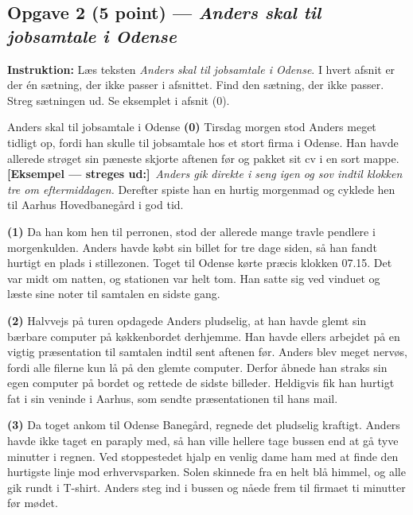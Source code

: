 \subsection*{Opgave 2 (5 point) --- \textit{Anders skal til jobsamtale i Odense}}

\textbf{Instruktion:} Læs teksten \textit{Anders skal til jobsamtale i Odense}. I hvert afsnit er der én sætning, der ikke passer i afsnittet. Find den sætning, der ikke passer. Streg sætningen ud. Se eksemplet i afsnit (0).

\begin{emailbox}{Anders skal til jobsamtale i Odense}
\textbf{(0)} Tirsdag morgen stod Anders meget tidligt op, fordi han skulle til jobsamtale hos et stort firma i Odense. Han havde allerede strøget sin pæneste skjorte aftenen før og pakket sit cv i en sort mappe. \textcolor{NCDRed}{\textbf{[Eksempel --- streges ud:]}}\ \textit{Anders gik direkte i seng igen og sov indtil klokken tre om eftermiddagen.} Derefter spiste han en hurtig morgenmad og cyklede hen til Aarhus Hovedbanegård i god tid.

\vspace{0.35em}
\textbf{(1)} Da han kom hen til perronen, stod der allerede mange travle pendlere i morgenkulden. Anders havde købt sin billet for tre dage siden, så han fandt hurtigt en plads i stillezonen. Toget til Odense kørte præcis klokken 07.15. Det var midt om natten, og stationen var helt tom. Han satte sig ved vinduet og læste sine noter til samtalen en sidste gang.

\vspace{0.35em}
\textbf{(2)} Halvvejs på turen opdagede Anders pludselig, at han havde glemt sin bærbare computer på køkkenbordet derhjemme. Han havde ellers arbejdet på en vigtig præsentation til samtalen indtil sent aftenen før. Anders blev meget nervøs, fordi alle filerne kun lå på den glemte computer. Derfor åbnede han straks sin egen computer på bordet og rettede de sidste billeder. Heldigvis fik han hurtigt fat i sin veninde i Aarhus, som sendte præsentationen til hans mail.

\vspace{0.35em}
\textbf{(3)} Da toget ankom til Odense Banegård, regnede det pludselig kraftigt. Anders havde ikke taget en paraply med, så han ville hellere tage bussen end at gå tyve minutter i regnen. Ved stoppestedet hjalp en venlig dame ham med at finde den hurtigste linje mod erhvervsparken. Solen skinnede fra en helt blå himmel, og alle gik rundt i T-shirt. Anders steg ind i bussen og nåede frem til firmaet ti minutter før mødet.


\end{emailbox}
